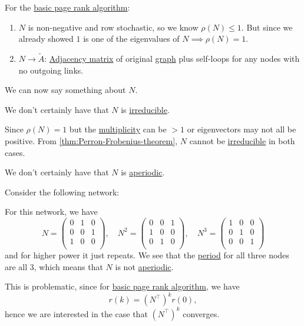 \begin{prev}
	For the \hyperref[algo:basic-page-rank-algorithm]{basic page rank algorithm}:
	\begin{enumerate}
		\item \(N\) is non-negative and row stochastic, so we know \(\rho (N) \leq 1\). But since we already showed \(1\) is one of the eigenvalues of \(N \implies \rho(N) = 1\).
		\item \(N \to \widetilde{A}\): \hyperref[def:adjacency-matrix]{Adjacency matrix} of original \hyperref[def:graph]{graph} plus self-loops for any nodes with no outgoing links.
	\end{enumerate}
\end{prev}

We can now say something about \(N\).

\begin{remark}
	We don't certainly have that \(N\) is \hyperref[def:irreducible]{irreducible}.
\end{remark}
\begin{explanation}
	Since \(\rho (N) = 1\) but the \hyperref[def:multiplicity]{multiplicity} can be \(> 1\) or eigenvectors may not all be positive.
	From \autoref{thm:Perron-Frobenius-theorem}, \(N\) cannot be \hyperref[def:irreducible]{irreducible} in both cases.
\end{explanation}

\begin{remark}
	We don't certainly have that \(N\) is \hyperref[def:aperiodic]{aperiodic}.
\end{remark}
\begin{explanation}
	Consider the following network:
	\begin{figure}[H]
		\centering
		\label{fig:rmk:lec11-1}
	\end{figure}
	For this network, we have
	\[
		N=\begin{pmatrix}
			0 & 1 & 0 \\
			0 & 0 & 1 \\
			1 & 0 & 0 \\
		\end{pmatrix},\quad N^2 = \begin{pmatrix}
			0 & 0 & 1 \\
			1 & 0 & 0 \\
			0 & 1 & 0 \\
		\end{pmatrix}, \quad N^3 = \begin{pmatrix}
			1 & 0 & 0 \\
			0 & 1 & 0 \\
			0 & 0 & 1 \\
		\end{pmatrix}
	\]
	and for higher power it just repeats. We see that the \hyperref[def:period]{period} for all three nodes	are all \(3\),
	which means that \(N\) is not \hyperref[def:aperiodic]{aperiodic}.
\end{explanation}
This is problematic, since for \hyperref[algo:basic-page-rank-algorithm]{basic page rank algorithm}, we have
\[
	r(k) = (N^{\top} )^k r(0),
\]
hence we are interested in the case that \((N^{\top})^k\) converges.

